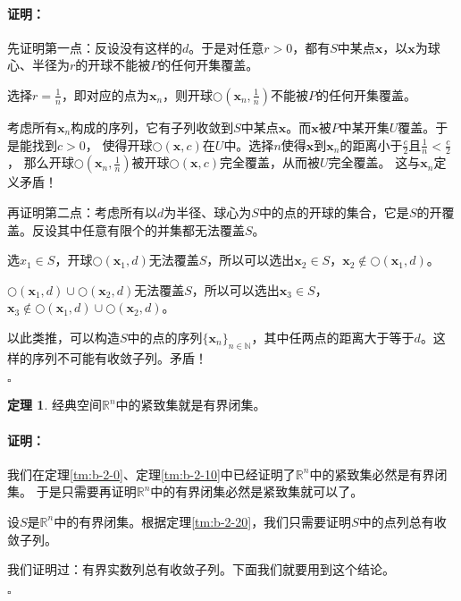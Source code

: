 \documentclass[12pt,UTF8]{ctexbook}
\theoremstyle{definition}
\newtheorem{tm}{定理}[section]
\theoremstyle{plain}
\renewenvironment{proof}{\paragraph{\textbf{证明：}}}{\hfill$\square$}
\begin{document}
\begin{appendix}
\begin{proof}
    先证明第一点：反设没有这样的$d$。于是对任意$r>0$，都有$S$中某点$\mathbf{x}$，以$\mathbf{x}$为球心、半径为$r$的开球不能被$P$的任何开集覆盖。

    选择$r = \frac{1}{n}$，即对应的点为$\mathbf{x}_n$，则开球$\bigcirc\left(\mathbf{x}_n,\frac{1}{n}\right)$不能被$P$的任何开集覆盖。

    考虑所有$\mathbf{x}_n$构成的序列，它有子列收敛到$S$中某点$\mathbf{x}$。而$\mathbf{x}$被$P$中某开集$U$覆盖。于是能找到$c>0$，
    使得开球$\bigcirc(\mathbf{x},c)$在$U$中。选择$n$使得$\mathbf{x}$到$\mathbf{x}_n$的距离小于$\frac{c}{2}$且$\frac{1}{n} < \frac{c}{2}$，
    那么开球$\bigcirc\left(\mathbf{x}_n,\frac{1}{n}\right)$被开球$\bigcirc(\mathbf{x},c)$完全覆盖，从而被$U$完全覆盖。
    这与$\mathbf{x}_n$定义矛盾！

    再证明第二点：考虑所有以$d$为半径、球心为$S$中的点的开球的集合，它是$S$的开覆盖。反设其中任意有限个的并集都无法覆盖$S$。

    选$x_1\in S$，开球$\bigcirc(\mathbf{x}_1,d)$无法覆盖$S$，所以可以选出$\mathbf{x}_2\in S$，$\mathbf{x}_2\notin \bigcirc(\mathbf{x}_1,d)$。

    $\bigcirc(\mathbf{x}_1,d)\cup \bigcirc(\mathbf{x}_2,d)$无法覆盖$S$，所以可以选出$\mathbf{x}_3\in S$，$\mathbf{x}_3\notin \bigcirc(\mathbf{x}_1,d)\cup \bigcirc(\mathbf{x}_2,d)$。

    以此类推，可以构造$S$中的点的序列$\{\mathbf{x}_n\}_{n\in\mathbb{N}}$，其中任两点的距离大于等于$d$。这样的序列不可能有收敛子列。矛盾！

\end{proof}

\begin{tm}
    经典空间$\mathbb{R}^n$中的紧致集就是有界闭集。
\end{tm}

\begin{proof}
    我们在定理\ref{tm:b-2-0}、定理\ref{tm:b-2-10}中已经证明了$\mathbb{R}^n$中的紧致集必然是有界闭集。
    于是只需要再证明$\mathbb{R}^n$中的有界闭集必然是紧致集就可以了。

    设$S$是$\mathbb{R}^n$中的有界闭集。根据定理\ref{tm:b-2-20}，我们只需要证明$S$中的点列总有收敛子列。

    我们证明过：有界实数列总有收敛子列。下面我们就要用到这个结论。


\end{proof}
\end{appendix}
\end{document}
